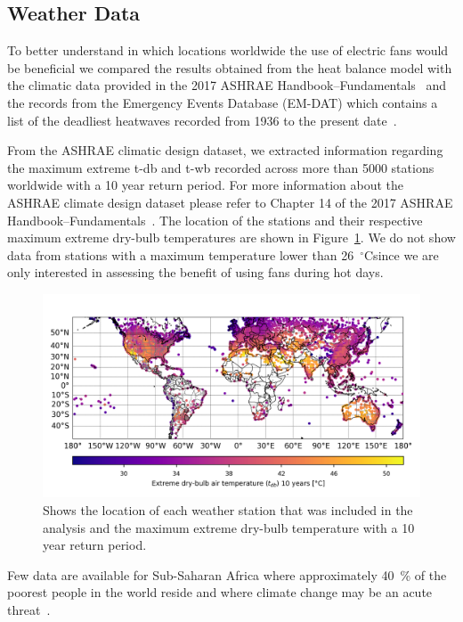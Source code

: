 \subsection{Weather Data}\label{subsec:weather-data}

To better understand in which locations worldwide the use of electric fans would be beneficial we compared the results obtained from the heat balance model with the climatic data provided in the 2017 ASHRAE Handbook--Fundamentals~\cite{ASHRA2017} and the records from the Emergency Events Database (EM-DAT) which contains a list of the deadliest heatwaves recorded from 1936 to the present date~\cite{EMDATThe70:online}.

From the ASHRAE climatic design dataset, we extracted information regarding the maximum extreme \ac{t-db} and \ac{t-wb} recorded across more than 5000 stations worldwide with a 10 year return period.
For more information about the ASHRAE climate design dataset please refer to Chapter 14 of the 2017 ASHRAE Handbook--Fundamentals~\cite{ASHRA2017}.
The location of the stations and their respective maximum extreme dry-bulb temperatures are shown in Figure~\ref{fig:world-map}.
We do not show data from stations with a maximum temperature lower than 26~$^\circ$C\@ since we are only interested in assessing the benefit of using fans during hot days.

\begin{figure}[thb!]
    \centering
    \includegraphics[width=\textwidth]{figures/world-map.png}
    \caption{Shows the location of each weather station that was included in the analysis and the maximum extreme dry-bulb temperature with a 10 year return period.}
    \label{fig:world-map}
\end{figure}

Few data are available for Sub-Saharan Africa where approximately 40~\% of the poorest people in the world reside and where climate change may be an acute threat~\cite{PovertyO1:online}.


